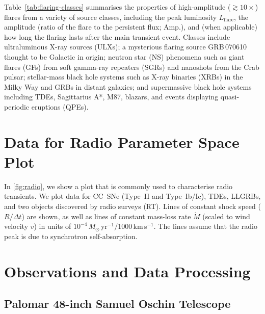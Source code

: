 \documentclass{nature_plusfigure}
\begin{document}
\begin{methods}
Table~\ref{tab:flaring-classes} summarises the properties of high-amplitude ($\gtrsim 10\times$) flares from a variety of source classes,
including the peak luminosity $L_\mathrm{flare}$, the amplitude (ratio of the flare to the persistent flux; Amp.), and (when applicable) how long the flaring lasts after the main transient event.
Classes include ultraluminous X-ray sources (ULXs\cite{Mucciarelli2007}); a mysterious flaring source GRB\,070610 thought to be Galactic in origin\cite{Kasliwal2008,Stefanescu2008,CastroTirado2008};
neutron star (NS) phenomena such as giant flares (GFs) from soft gamma-ray repeaters (SGRs\cite{Svinkin2021,Frederiks2007}) and nanoshots from the Crab pulsar\cite{Hankins2003}; stellar-mass black hole systems such as X-ray binaries (XRBs\cite{Fender1997}) in the Milky Way and GRBs\cite{Racusin2008} in distant galaxies; and supermassive black hole systems including TDEs\cite{vanVelzen2021,Payne2022}, Sagittarius A*\cite{Marrone2008}, M87\cite{Abramowski2012}, blazars\cite{Nesci2021}, and events displaying quasi-periodic eruptions (QPEs\cite{Miniutti2023}).

\section{Data for Radio Parameter Space Plot}
\label{sec:data-radio-parameter-space}

In \ref{fig:radio}, we show a plot that is commonly used to characterise radio transients\cite{Chevalier1998,Ho2019}.
We plot data for CC~SNe (Type~II and Type~Ib/Ic), TDEs, LLGRBs, and two objects discovered by radio surveys (RT\cite{Dong2021,Mooley2022}). Lines of constant shock speed ($R/\Delta t$) are shown, as well as lines of constant mass-loss rate $\dot{M}$ (scaled to wind velocity $v$) in units of $10^{-4}\,M_\odot$\,yr$^{-1}/1000\,$km\,s$^{-1}$. The lines assume that the radio peak is due to synchrotron self-absorption\cite{Chevalier1998}. %

\section{Observations and Data Processing}

\subsection{Palomar 48-inch Samuel Oschin Telescope}
\label{sec:p48}


\end{methods}
\end{document}
